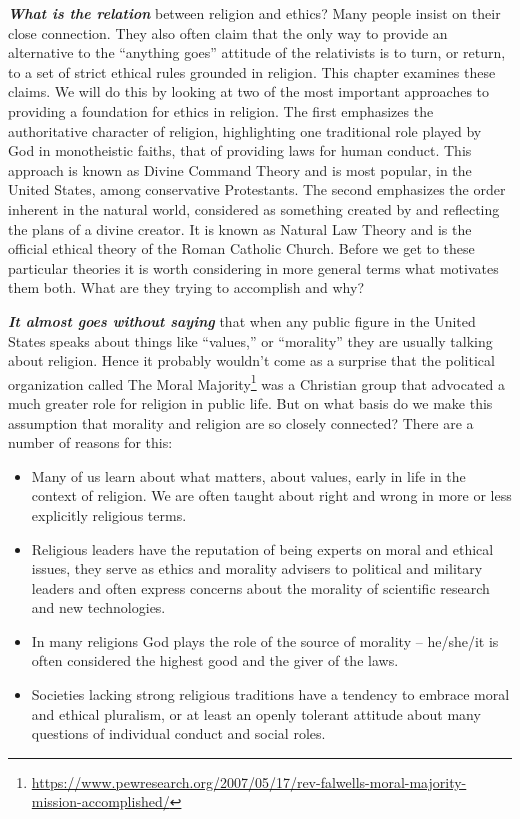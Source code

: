 \documentclass[
  12pt, openany]{book}
\providecommand{\tightlist}{%
  \setlength{\itemsep}{0pt}\setlength{\parskip}{0pt}}
\renewcommand{\href}[2]{#2\footnote{\url{#1}}}
\begin{document}
\textbf{\emph{What is the relation}} between religion and ethics? Many people insist on their close connection. They also often claim that the only way to provide an alternative to the ``anything goes'' attitude of the relativists is to turn, or return, to a set of strict ethical rules grounded in religion. This chapter examines these claims. We will do this by looking at two of the most important approaches to providing a foundation for ethics in religion. The first emphasizes the authoritative character of religion, highlighting one traditional role played by God in monotheistic faiths, that of providing laws for human conduct. This approach is known as Divine Command Theory and is most popular, in the United States, among conservative Protestants. The second emphasizes the order inherent in the natural world, considered as something created by and reflecting the plans of a divine creator. It is known as Natural Law Theory and is the official ethical theory of the Roman Catholic Church. Before we get to these particular theories it is worth considering in more general terms what motivates them both. What are they trying to accomplish and why?

\textbf{\emph{It almost goes without saying}} that when any public figure in the United States speaks about things like ``values,'' or ``morality'' they are usually talking about religion. Hence it probably wouldn't come as a surprise that the political organization called \href{https://www.pewresearch.org/2007/05/17/rev-falwells-moral-majority-mission-accomplished/}{The Moral Majority} was a Christian group that advocated a much greater role for religion in public life. But on what basis do we make this assumption that morality and religion are so closely connected? There are a number of reasons for this:

\begin{itemize}
\tightlist
\item
  Many of us learn about what matters, about values, early in life in the context of religion. We are often taught about right and wrong in more or less explicitly religious terms.
\item
  Religious leaders have the reputation of being experts on moral and ethical issues, they serve as ethics and morality advisers to political and military leaders and often express concerns about the morality of scientific research and new technologies.
\item
  In many religions God plays the role of the source of morality -- he/she/it is often considered the highest good and the giver of the laws.
\item
  Societies lacking strong religious traditions have a tendency to embrace moral and ethical pluralism, or at least an openly tolerant attitude about many questions of individual conduct and social roles.
\end{itemize}
\end{document}
